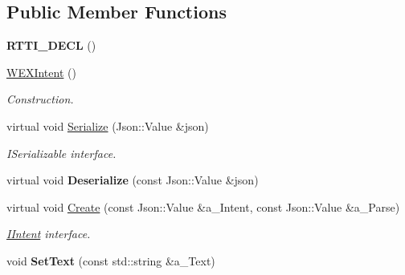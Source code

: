 \subsection*{Public Member Functions}
\begin{DoxyCompactItemize}
\item 
\mbox{\label{class_w_e_x_intent_a147fbd4b602cc905bf12c96eb793ad32}} 
{\bfseries R\+T\+T\+I\+\_\+\+D\+E\+CL} ()
\item 
\mbox{\label{class_w_e_x_intent_ae666a2f4ad49510f87080803142942fb}} 
\hyperlink{class_w_e_x_intent_ae666a2f4ad49510f87080803142942fb}{W\+E\+X\+Intent} ()
\begin{DoxyCompactList}\small\item\em Construction. \end{DoxyCompactList}\item 
\mbox{\label{class_w_e_x_intent_ae48dcbfa33d0edaf197f67d881d1a522}} 
virtual void \hyperlink{class_w_e_x_intent_ae48dcbfa33d0edaf197f67d881d1a522}{Serialize} (Json\+::\+Value \&json)
\begin{DoxyCompactList}\small\item\em I\+Serializable interface. \end{DoxyCompactList}\item 
\mbox{\label{class_w_e_x_intent_af3be5fe081fa36fe52bf55c93b410087}} 
virtual void {\bfseries Deserialize} (const Json\+::\+Value \&json)
\item 
\mbox{\label{class_w_e_x_intent_a13876537d4d771a832048847bce39c98}} 
virtual void \hyperlink{class_w_e_x_intent_a13876537d4d771a832048847bce39c98}{Create} (const Json\+::\+Value \&a\+\_\+\+Intent, const Json\+::\+Value \&a\+\_\+\+Parse)
\begin{DoxyCompactList}\small\item\em \hyperlink{class_i_intent}{I\+Intent} interface. \end{DoxyCompactList}\item 
\mbox{\label{class_w_e_x_intent_a831302f488e56f39a195c8c5564ea0f3}} 
void {\bfseries Set\+Text} (const std\+::string \&a\+\_\+\+Text)
\item 
\mbox{\label{class_w_e_x_intent_ac03b565dc7feb294efb2de62a889c5f8}} 

\end{DoxyCompactItemize}
